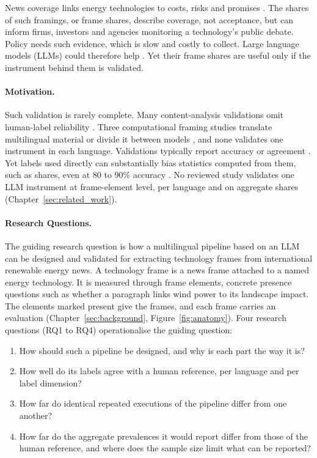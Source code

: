 News coverage links energy technologies to costs, risks and promises \parencite[e.g.,][]{stephens2009windmedia,ali2025hydrogenframing}. The shares of such framings, or frame shares, describe coverage, not acceptance, but can inform firms, investors and agencies monitoring a technology's public debate. Policy needs such evidence, which is slow and costly to collect. Large language models (LLMs) could therefore help \parencite[pp.~1--2]{toetzke2023llmclimatetech}. Yet their frame shares are useful only if the instrument behind them is validated.

\paragraph{Motivation.}
Such validation is rarely complete. Many content-analysis validations omit human-label reliability \parencite{song2020validations}. Three computational framing studies translate multilingual material or divide it between models \parencite{toetzke2022energydiscourse,jumle2024findingframes,guo2023openframing}, and none validates one instrument in each language. Validations typically report accuracy or agreement \parencite[p.~2]{linder2026multicalibrated}. Yet labels used directly can substantially bias statistics computed from them, such as shares, even at 80 to 90\% accuracy \parencite{egami2023dsl}. No reviewed study validates one LLM instrument at frame-element level, per language and on aggregate shares (Chapter~\ref{sec:related_work}).

\paragraph{Research Questions.}
The guiding research question is how a multilingual pipeline based on an LLM can be designed and validated for extracting technology frames from international renewable energy news. A technology frame is a news frame attached to a named energy technology. It is measured through frame elements, concrete presence questions such as whether a paragraph links wind power to its landscape impact. The elements marked present give the frames, and each frame carries an evaluation (Chapter~\ref{sec:background}, Figure~\ref{fig:anatomy}). Four research questions (RQ1 to RQ4) operationalise the guiding question:
\begin{enumerate}
\item[RQ1] How should such a pipeline be designed, and why is each part the way it is?
\item[RQ2] How well do its labels agree with a human reference, per language and per label dimension?
\item[RQ3] How far do identical repeated executions of the pipeline differ from one another?
\item[RQ4] How far do the aggregate prevalences it would report differ from those of the human reference, and where does the sample size limit what can be reported?
\end{enumerate}

